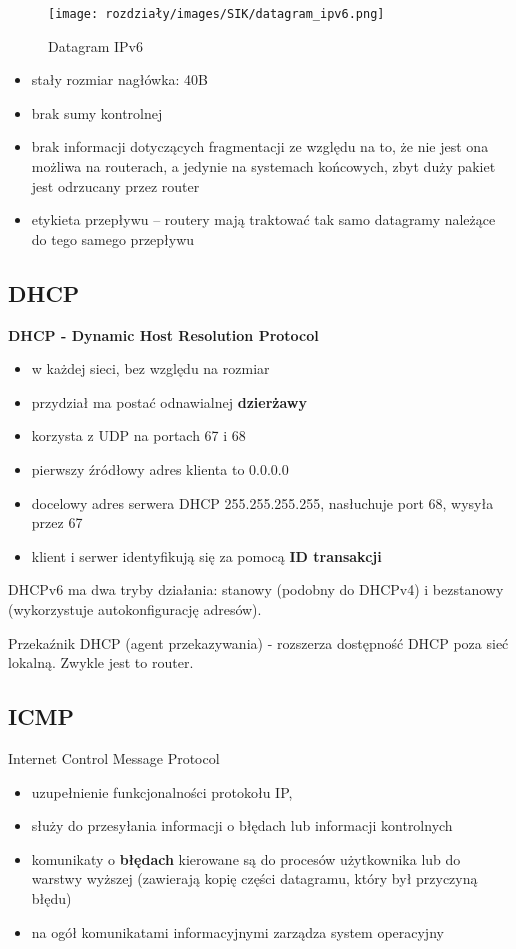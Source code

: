 \begin{figure}[H]
    \centering
    \texttt{[image: rozdziały/images/SIK/datagram\_ipv6.png]}
    \caption{Datagram IPv6}
\end{figure}

\begin{itemize}
    \item stały rozmiar nagłówka: 40B
    \item brak sumy kontrolnej 
    \item brak informacji dotyczących fragmentacji ze względu na to, że nie jest ona możliwa na routerach, a jedynie na systemach końcowych, zbyt duży pakiet jest odrzucany przez router
    \item etykieta przepływu – routery mają traktować tak samo datagramy należące do tego samego przepływu
\end{itemize}

\subsection{DHCP}

\textbf{DHCP - Dynamic Host Resolution Protocol}
\begin{itemize}
    \item w każdej sieci, bez względu na rozmiar
    \item przydział ma postać odnawialnej \textbf{dzierżawy}
    \item korzysta z UDP na portach 67 i 68
    \item pierwszy źródłowy adres klienta to 0.0.0.0
    \item docelowy adres serwera DHCP 255.255.255.255, nasłuchuje port 68, wysyła przez 67
    \item klient i serwer identyfikują się za pomocą \textbf{ID transakcji}
\end{itemize}

DHCPv6 ma dwa tryby działania: stanowy (podobny do DHCPv4) i bezstanowy (wykorzystuje autokonfigurację adresów).

Przekaźnik DHCP (agent przekazywania) - rozszerza dostępność DHCP poza sieć lokalną. Zwykle jest to router.

\subsection{ICMP}

Internet Control Message Protocol

\begin{itemize}
    \item uzupełnienie funkcjonalności protokołu IP, 
    \item służy do przesyłania informacji o błędach lub informacji kontrolnych
    \item komunikaty o \textbf{błędach} kierowane są do procesów użytkownika lub do warstwy wyższej (zawierają kopię części datagramu, który był przyczyną błędu)
    \item na ogół komunikatami informacyjnymi zarządza system operacyjny
\end{itemize}

